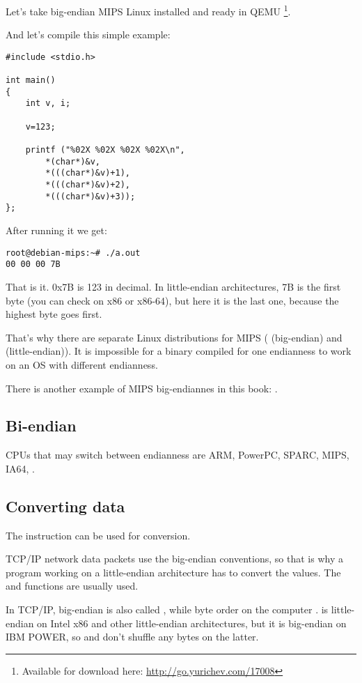 Let's take big-endian MIPS Linux installed and ready in QEMU
\footnote{Available for download here: \url{http://go.yurichev.com/17008}}.

And let's compile this simple example:

\begin{lstlisting}
#include <stdio.h>

int main()
{
	int v, i;

	v=123;

	printf ("%02X %02X %02X %02X\n", 
		*(char*)&v,
		*(((char*)&v)+1),
		*(((char*)&v)+2),
		*(((char*)&v)+3));
};
\end{lstlisting}

After running it we get:

\begin{lstlisting}
root@debian-mips:~# ./a.out 
00 00 00 7B
\end{lstlisting}

That is it.
0x7B is 123 in decimal.
In little-endian architectures, 7B is the first byte (you can check on x86 or x86-64), 
but here it is the last one, because the highest byte goes first.

That's why there are separate Linux distributions for MIPS
( (big-endian) and  (little-endian)).
It is impossible for a binary compiled for one endianness to work on an \ac{OS} with different endianness. 

There is another example of MIPS big-endiannes in this book: .

\subsection{Bi-endian}

CPUs that may switch between endianness are ARM, PowerPC, SPARC, MIPS, \ac{IA64}, \etc{}.

\subsection{Converting data}

The  instruction can be used for conversion.

TCP/IP network data packets use the big-endian conventions, so that is why a program working on a little-endian architecture
has to convert the values.
The  and  functions are usually used.

In TCP/IP, big-endian is also called , while byte order on the computer .
 is little-endian on Intel x86 and other little-endian architectures,
but it is big-endian on IBM POWER, so  and  don't shuffle any bytes on the latter.

